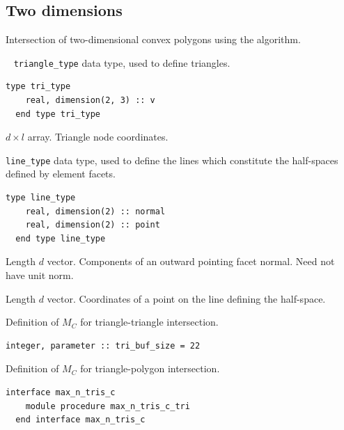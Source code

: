 \documentclass{article}
\begin{document}
\subsection{Two dimensions}\label{sect:2D_intersection}

Intersection of two-dimensional convex polygons using the \citet{sutherland1974}
algorithm.

~\newline
\verb+triangle_type+ data type, used to define triangles.

\begin{lstlisting}[language=FORTRAN]    
  type tri_type
    real, dimension(2, 3) :: v
  end type tri_type
\end{lstlisting} 

\begin{description}[font=\ttfamily\bfseries,leftmargin=2.2\parindent,labelindent=1.7\parindent,noitemsep]
  \item[v] $d \times l$ array. Triangle node coordinates.
\end{description}

\noindent \verb+line_type+ data type, used to define the lines which constitute
the half-spaces defined by element facets.

\begin{lstlisting}[language=FORTRAN]   
  type line_type
    real, dimension(2) :: normal
    real, dimension(2) :: point
  end type line_type
\end{lstlisting} 

\begin{description}[font=\ttfamily\bfseries,leftmargin=2.2\parindent,labelindent=1.7\parindent,noitemsep]
  \item[normal] Length $d$ vector. Components of an outward pointing facet
    normal. Need not have unit norm.
  \item[point] Length $d$ vector. Coordinates of a point on the line defining
    the half-space.
\end{description}

\noindent Definition of $M_C$ for triangle-triangle intersection.
  
\begin{lstlisting}[language=FORTRAN] 
  integer, parameter :: tri_buf_size = 22
\end{lstlisting}

\noindent Definition of $M_C$ for triangle-polygon intersection.
  
\begin{lstlisting}[language=FORTRAN]
  interface max_n_tris_c
    module procedure max_n_tris_c_tri
  end interface max_n_tris_c
\end{lstlisting}
\end{document}
